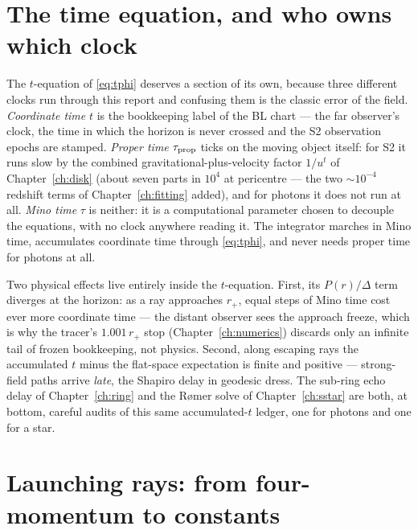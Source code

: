 \section{The time equation, and who owns which clock}
\label{sec:timeclocks}

The $t$-equation of \eqref{eq:tphi} deserves a section of its own,
because three different clocks run through this report and confusing
them is the classic error of the field. \emph{Coordinate time} $t$ is
the bookkeeping label of the BL chart — the far observer's clock, the
time in which the horizon is never crossed and the S2 observation
epochs are stamped. \emph{Proper time} $\tau_{\rm prop}$ ticks on the
moving object itself: for S2 it runs slow by the combined
gravitational-plus-velocity factor $1/u^t$ of Chapter~\ref{ch:disk}
(about seven parts in $10^{4}$ at pericentre — the two
$\sim$$10^{-4}$ redshift terms of Chapter~\ref{ch:fitting} added),
and for photons it does not run at all. \emph{Mino time} $\tau$ is neither: it is a
computational parameter chosen to decouple the equations, with no
clock anywhere reading it. The integrator marches in Mino time,
accumulates coordinate time through \eqref{eq:tphi}, and never needs
proper time for photons at all.

Two physical effects live entirely inside the $t$-equation. First,
its $P(r)/\Delta$ term diverges at the horizon: as a ray approaches
$r_+$, equal steps of Mino time cost ever more coordinate time — the
distant observer sees the approach freeze, which is why the tracer's
$1.001\,r_+$ stop (Chapter~\ref{ch:numerics}) discards only an
infinite tail of frozen bookkeeping, not physics. Second, along
escaping rays the accumulated $t$ minus the flat-space expectation is
finite and positive — strong-field paths arrive \emph{late}, the
Shapiro delay in geodesic dress. The sub-ring echo delay of
Chapter~\ref{ch:ring} and the R{\o}mer solve of
Chapter~\ref{ch:sstar} are both, at bottom, careful audits of this
same accumulated-$t$ ledger, one for photons and one for a star.

\section{Launching rays: from four-momentum to constants}
\label{sec:makenullray}

